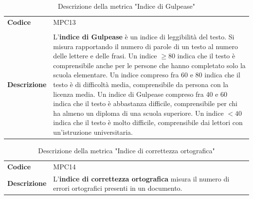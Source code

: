 \documentclass[a4paper,12pt]{article}
\begin{document}
            {\renewcommand{\arraystretch}{1.4}
            \begin{table}[H]
            \centering
            \begin{tabularx}{\textwidth}{|l|X|}
                \hline
                \rowcolor{gold}
                \multicolumn{2}{|c|}{\textbf{Indice di Gulpease}}\\
                \hline
                \textbf{Codice} & MPC13\\
                \hline
                \raisebox{0.6\height}{\textbf{Formula}} &  \rule{0pt}{5ex}\raisebox{0.3\height}{\( \displaystyle \text{Gulpease} = 89-\left(\frac{\text{Numero di lettere}}{\text{Numero di parole}}\right)*10+\left(\frac{\text{Numero di frasi}}{\text{Numero di parole}}\right)*300 \)}\\
                \hline
                \textbf{Descrizione} & L'\textbf{indice di Gulpease} è un indice di leggibilità del testo. Si misura rapportando il numero di parole di un testo al numero delle lettere e delle frasi. Un indice $\ge80$ indica che il testo è comprensibile anche per le persone che hanno completato solo la scuola elementare. Un indice compreso fra 60 e 80 indica che il testo è di difficoltà media, comprensibile da persona con la licenza media. Un indice di Gulpease compreso fra 40 e 60 indica che il testo è abbastanza difficile, comprensibile per chi ha almeno un diploma di una scuola superiore. Un indice $<40$ indica che il testo è molto difficile, comprensibile dai lettori con un'istruzione universitaria. \\
                \hline
            \end{tabularx}      
            \caption{Descrizione della metrica "Indice di Gulpease"}
            \end{table}
            }

            {\renewcommand{\arraystretch}{1.4}
            \begin{table}[H]
            \centering
            \begin{tabularx}{\textwidth}{|l|X|}
                \hline
                \rowcolor{gold}
                \multicolumn{2}{|c|}{\textbf{Indice di correttezza ortografica}}\\
                \hline
                \textbf{Codice} & MPC14\\
                \hline
                \textbf{Descrizione} & L'\textbf{indice di correttezza ortografica} misura il numero di errori ortografici presenti in un documento. \\
                \hline
            \end{tabularx}      
            \caption{Descrizione della metrica "Indice di correttezza ortografica"}
            \end{table}
            }
        
\end{document}
